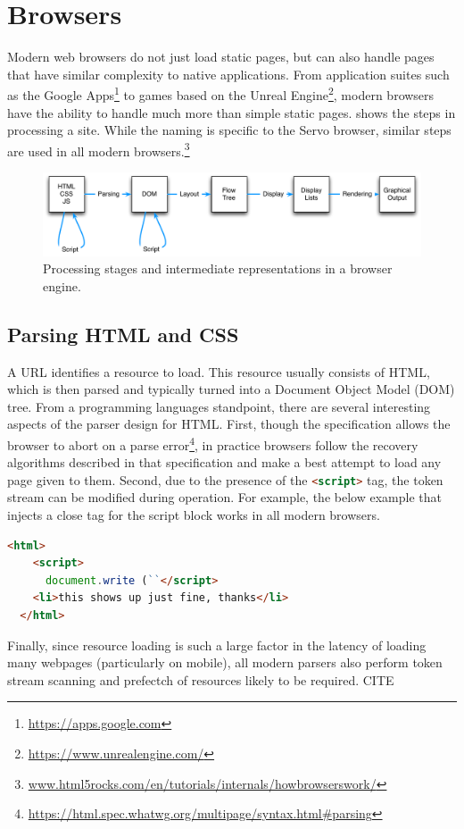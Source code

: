 
\section{Browsers}
\label{sec:browsers}

Modern web browsers do not just load static pages, but can also handle pages that have similar
complexity to native applications.
From application suites such as the Google Apps\footnote{\url{https://apps.google.com}} to games
based on the Unreal Engine\footnote{\url{https://www.unrealengine.com/}},
modern browsers have the ability to handle much more than simple static pages.
 shows the steps in processing a site.
While the naming is specific to the Servo browser, similar steps are used in all modern browsers.\footnote{\url{www.html5rocks.com/en/tutorials/internals/howbrowserswork/}}
\begin{figure}[ht]
  \begin{center}
    \includegraphics[scale=0.7]{pics/browser}
  \end{center}%
  \caption{Processing stages and intermediate representations in a browser engine.}
  \label{fig:browser}
\end{figure}%

\subsection{Parsing HTML and CSS}

A URL identifies a resource to load.
This resource usually consists of HTML, which is then parsed and typically turned into a Document Object
Model (DOM) tree.
From a programming languages standpoint, there are several interesting aspects of the parser design
for HTML.
First, though the specification allows the browser to abort on a parse error\footnote{\url{https://html.spec.whatwg.org/multipage/syntax.html#parsing}},
in practice browsers follow the recovery algorithms described in that specification and make a best attempt to
load any page given to them.
Second, due to the presence of the \lstinline[language=HTML]{<script>} tag, the token stream can be modified
during operation.
For example, the below example that injects a close tag for the script block works in all modern browsers.
\begin{lstlisting}[language=HTML]
  <html>
    <script>
      document.write (``</script>
    <li>this shows up just fine, thanks</li>
  </html>
\end{lstlisting}
Finally, since resource loading is such a large factor in the latency of loading many webpages (particularly on mobile),
all modern parsers also perform token stream scanning and prefectch of resources likely to be required. CITE

